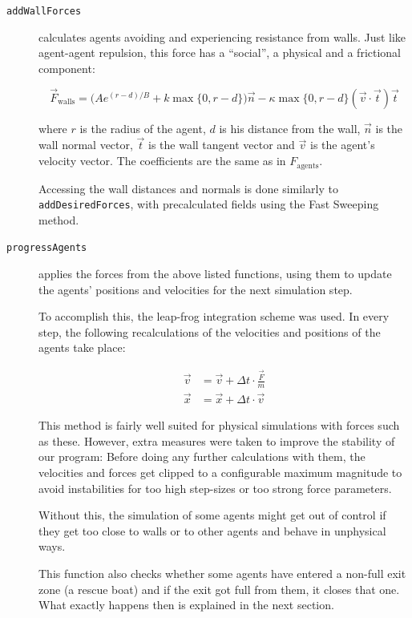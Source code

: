 \documentclass[11pt]{article}
\begin{document}
\begin{description}
\item[\texttt{addWallForces}] calculates agents avoiding and experiencing
resistance from walls.  Just like agent-agent repulsion, this force has a
``social'', a physical and a frictional component:

\[ \vec{F}_\text{walls} = \big(A e^{(r-d)/B} + k \max\{0, r-d\}\big) \vec{n} -
                    \kappa \max\{0, r-d\} (\vec{v} \cdot \vec{t}) \vec{t} \]

where $r$ is the radius of the agent, $d$ is his distance from the wall,
$\vec{n}$ is the wall normal vector, $\vec{t}$ is the wall tangent vector and
$\vec{v}$ is the agent's velocity vector.  The coefficients are the same as in
$F_\text{agents}$.

Accessing the wall distances and normals is done similarly to
\texttt{addDesiredForces}, with precalculated fields using the Fast Sweeping
method.

\item[\texttt{progressAgents}] applies the forces from the above listed
functions, using them to update the agents' positions and velocities for the
next simulation step.

To accomplish this, the leap-frog integration scheme was used.  In every step,
the following recalculations of the velocities and positions of the agents take
place:

\begin{align*}
\vec{v} &= \vec{v} + \Delta t \cdot \frac{\vec{F}}{m}  \\
\vec{x} &= \vec{x} + \Delta t \cdot \vec{v}
\end{align*}

This method is fairly well suited for physical simulations with forces such as
these.  However, extra measures were taken to improve the stability of our
program:  Before doing any further calculations with them, the velocities and
forces get clipped to a configurable maximum magnitude to avoid instabilities
for too high step-sizes or too strong force parameters.

Without this, the simulation of some agents might get out of control if they
get too close to walls or to other agents and behave in unphysical ways.

This function also checks whether some agents have entered a non-full exit zone
(a rescue boat) and if the exit got full from them, it closes that one.  What
exactly happens then is explained in the next section.

\end{description}
\end{document}
